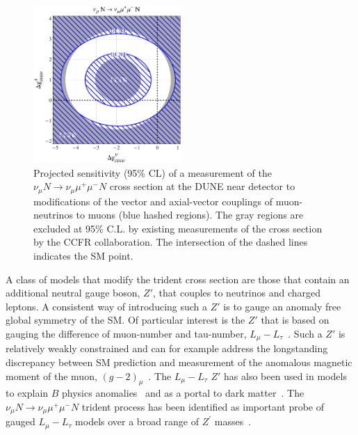\begin{figure}[tb!]
\centering
\includegraphics[width=0.5\textwidth]{graphics/model_independent.pdf}
\caption{Projected sensitivity (95\% CL) of a measurement of the $\nu_\mu N \to \nu_\mu \mu^+\mu^- N$ cross section at the DUNE near detector to modifications of the vector and axial-vector couplings of muon-neutrinos to muons (blue hashed regions). The gray regions are excluded at 95\% C.L. by existing measurements of the cross section by the CCFR collaboration. The intersection of the dashed lines indicates the SM point.}
\label{fig:trident_gVgA}
\end{figure}

A class of models that modify the trident cross section are those that contain an additional neutral gauge boson, $Z'$, that couples to neutrinos and charged leptons. A consistent way of introducing such a $Z'$ is to gauge an anomaly free global symmetry of the SM. Of particular interest is the $Z'$ that is based on gauging the difference of muon-number and tau-number, $L_\mu - L_\tau$~\cite{He:1990pn,He:1991qd}. Such a $Z'$ is relatively weakly constrained and can for example address the longstanding discrepancy between SM prediction and measurement of the anomalous magnetic moment of the muon, $(g-2)_\mu$~\cite{Baek:2001kca,Harigaya:2013twa}. The $L_\mu - L_\tau$ $Z'$ has also been used in models to explain $B$ physics anomalies~\cite{Altmannshofer:2014cfa} and as a portal to dark matter~\cite{Baek:2008nz,Altmannshofer:2016jzy}. The $\nu_\mu N \to \nu_\mu \mu^+\mu^- N$ trident process has been identified as important probe of gauged $L_\mu - L_\tau$ models over a broad range of $Z^\prime$ masses~\cite{Altmannshofer:2014cfa,Altmannshofer:2014pba}.

